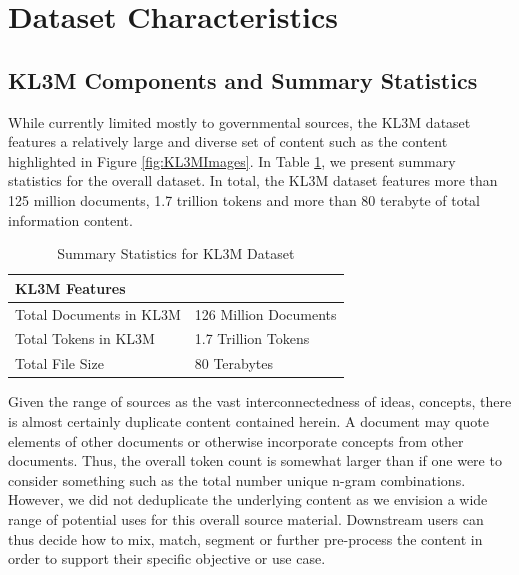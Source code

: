 \section{Dataset Characteristics}

\subsection{KL3M Components and Summary Statistics}
While currently limited mostly to governmental sources, the KL3M dataset features a relatively large and diverse set of content such as the content highlighted in Figure \ref{fig:KL3MImages}.  In Table \ref{table:summarystats}, we present summary statistics for the overall dataset.  In total, the KL3M dataset features more than 125 million documents, 1.7 trillion tokens and more than 80 terabyte of total information content.  

\begin{table}[!htbp]
    \small
    \centering
    \begin{tabularx}{0.6\linewidth}{X @{\hskip 3pt} l @{\hskip 3pt}}
        \toprule
        \textbf{KL3M Features} & \\
        \midrule
        Total Documents in KL3M & 126 Million Documents \\
        Total Tokens in KL3M  & 1.7 Trillion Tokens \\
        Total File Size & 80 Terabytes \\
        \midrule
        \bottomrule
    \end{tabularx}
    \caption{Summary Statistics for KL3M Dataset}
    \label{table:summarystats}
\end{table}

Given the range of sources as the vast interconnectedness of ideas, concepts, there is almost certainly duplicate content contained herein. A document may quote elements of other documents or otherwise incorporate concepts from other documents.  Thus, the overall token count is somewhat larger than if one were to consider something such as the total number unique n-gram combinations.  However, we did not deduplicate the underlying content as we envision a wide range of potential uses for this overall source material.  Downstream users can thus decide how to mix, match, segment or further pre-process the content in order to support their specific objective or use case.  

